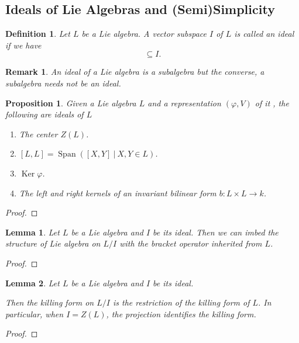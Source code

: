 \documentclass{article}
\newtheorem{proposition}{Proposition}[section]
\newtheorem{definition}{Definition}[section]
\newtheorem{lemma}{Lemma}[section]
\newtheorem{remark}{Remark}[section]
\numberwithin{equation}{section}
\DeclareMathOperator{\Span}{Span}
\DeclareMathOperator{\Ker}{Ker}
\begin{document}
\subsection{Ideals of Lie Algebras and (Semi)Simplicity}

\begin{definition}
Let $L$ be a Lie algebra. A vector subspace $I$ of $L$ is called an ideal if we have
\begin{equation*}
[I,L]\subseteq I.
\end{equation*}
\end{definition}

\begin{remark}
An ideal of a Lie algebra is a subalgebra but the converse, a subalgebra needs not be an ideal. %
\end{remark}

\begin{proposition}
Given a Lie algebra $L$ and a representation $(\varphi, V)$ of it , the following are ideals of $L$
\begin{enumerate}
\item The center $Z(L)$.
\item $[L, L] = \Span([X,Y]\:|\: X,Y\in L)$.
\item $\Ker\varphi$.
\item The left and right kernels of an invariant bilinear form $b:L\times L\to k$.
\end{enumerate}
\end{proposition}
\begin{proof}
\end{proof}

\begin{lemma}
Let $L$ be a Lie algebra and $I$ be its ideal. Then we can imbed the structure of Lie algebra on $L/I$ with the bracket operator inherited from $L$.
\end{lemma}

\begin{proof}
\end{proof}

\begin{lemma}
Let $L$ be a Lie algebra and $I$ be its ideal.\\
\par Then the killing form on $L/I$ is the restriction of the killing form of $L$. In particular, when $I=Z(L)$, the projection identifies the killing form.
\end{lemma}

\begin{proof}
\end{proof}
\end{document}
